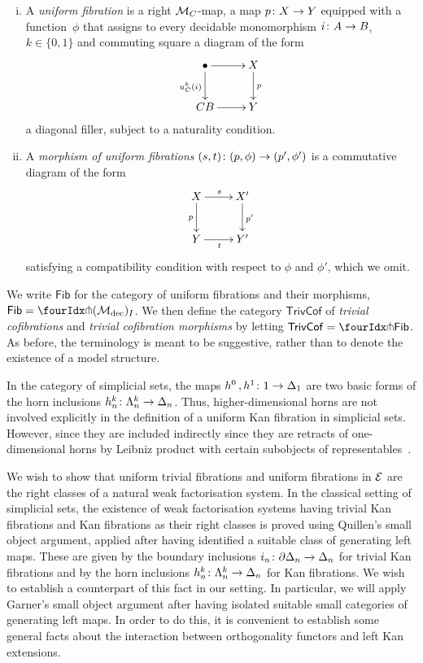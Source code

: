 \documentclass[reqno,10pt,a4paper,oneside]{amsart}
\begin{document}
\begin{definition} \hfill 
\begin{enumerate}[(i)] 
\item  A \emph{uniform  fibration} is a right $\cal{M}_{\cyl}$-map, \ie 
a map  $p \co X \to Y$ equipped with a function~$\phi$ that assigns
to every decidable monomorphism $i \co A \to B$, $k \in \{0, 1\}$  and commuting
square a diagram of the form
\[
\xymatrix{
\bullet \ar[r] \ar[d]_{u^k_\cyl(i)} & X \ar[d]^p \\
\cyl B \ar[r] & Y }
\]
a diagonal filler, subject to a naturality condition.
 \item A \emph{morphism of uniform fibrations} $(s,t) \co (p, \phi) \to (p', \phi')$ is
 a commutative diagram of the form
 \[
 \xymatrix{
  X \ar[d]_{p} \ar[r]^s & X' \ar[d]^{p'} \\
  Y \ar[r]_{t}& Y' } 
  \]
  satisfying a compatibility condition with respect to $\phi$ and $\phi'$, which we omit. 
 \end{enumerate}
 \end{definition}
 
 We write $\mathsf{Fib}$ for the category of uniform fibrations and their morphisms, \ie 
$\mathsf{Fib} = \liftr{(\cal{M}_{\textup{dec}})_I}$. We then define
the category $\mathsf{TrivCof}$ of \emph{trivial cofibrations} and \emph{trivial cofibration morphisms}
by letting \ie $\mathsf{TrivCof} = \liftl{\mathsf{Fib}}$. As before, the terminology is meant to be
suggestive, rather than to denote the existence of a model structure. 
 
 \begin{remark} In the category of simplicial sets, the maps $h^0 \, , h^1 \co 1 \to \Delta_1$ are two basic forms of the horn
 inclusions $h^k_n \co \Lambda^k_n \to \Delta_n$.  Thus, higher-dimensional horns are not involved
 explicitly in the definition of a uniform Kan fibration in simplicial sets. However, 
  since they are included indirectly since they are  retracts of one-dimensional horns by Leibniz product 
  with certain subobjects of representables~\cite{joyal-quaderns}.
  \end{remark} 
 
We wish to show that uniform trivial fibrations and uniform fibrations in $\cal{E}$ are the
right classes of a natural weak factorisation system. In the classical setting of 
simplicial sets, the existence of weak factorisation systems having trivial Kan fibrations
and Kan fibrations as their right classes is proved using Quillen's small object argument,
applied after having identified a suitable class of generating left maps. These are given
by the boundary inclusions $i_n \co \partial \Delta_n \to \Delta_n$ for trivial Kan fibrations
and by the horn inclusions $h^k_n \co \Lambda^k_n \to \Delta_n$ for Kan fibrations. 
We wish to establish a counterpart of  this fact in our setting. In particular,
we will apply Garner's small object argument after having isolated suitable
small categories of generating left maps. In order to do this, it is convenient
to establish some general facts about the interaction between orthogonality 
functors and left Kan extensions. 
\end{document}
